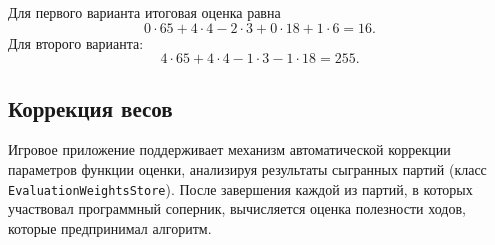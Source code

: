 \documentclass[a4paper,12pt]{diplom}
\begin{document}
\begin{table}[H]
\centering
\caption{Пример сравнения двух ходов с помощью функции оценки}
\label{tab:evaluation_example}
\end{table}

Для первого варианта итоговая оценка равна
\[
0 \cdot 65 + 4 \cdot 4 - 2 \cdot 3 + 0 \cdot 18 + 1 \cdot 6 = 16.
\]
Для второго варианта:
\[
4 \cdot 65 + 4 \cdot 4 - 1 \cdot 3 - 1 \cdot 18 = 255.
\]
\subsection*{Коррекция весов}

Игровое приложение поддерживает механизм автоматической коррекции параметров функции оценки, анализируя результаты сыгранных партий (класс \texttt{EvaluationWeightsStore}). После завершения каждой из партий, в которых участвовал программный соперник, вычисляется оценка полезности ходов, которые предпринимал алгоритм.
\end{document}
